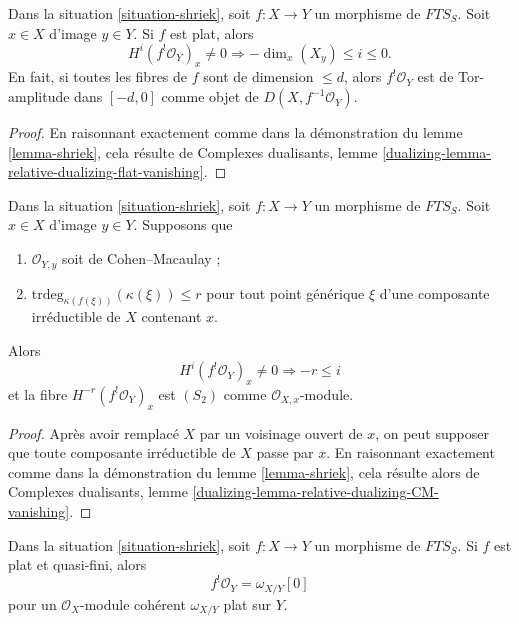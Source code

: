 \begin{lemma}
\label{lemma-flat-shriek}
Dans la situation \ref{situation-shriek}, soit $f : X \to Y$ un morphisme de $\textit{FTS}_S$. Soit $x \in X$ d'image $y \in Y$. Si $f$ est plat, alors
$$
H^i(f^!\mathcal{O}_Y)_x \not = 0
\Rightarrow - \dim_x(X_y) \leq i \leq 0.
$$
En fait, si toutes les fibres de $f$ sont de dimension $\leq d$, alors $f^!\mathcal{O}_Y$ est de Tor-amplitude dans $[-d, 0]$ comme objet de $D(X, f^{-1}\mathcal{O}_Y)$.
\end{lemma}

\begin{proof}
En raisonnant exactement comme dans la démonstration du lemme \ref{lemma-shriek}, cela résulte de Complexes dualisants, lemme \ref{dualizing-lemma-relative-dualizing-flat-vanishing}.
\end{proof}

\begin{lemma}
\label{lemma-shriek-over-CM}
Dans la situation \ref{situation-shriek}, soit $f : X \to Y$ un morphisme de $\textit{FTS}_S$. Soit $x \in X$ d'image $y \in Y$. Supposons que
\begin{enumerate}
\item $\mathcal{O}_{Y, y}$ soit de Cohen–Macaulay ;
\item $\text{trdeg}_{\kappa(f(\xi))}(\kappa(\xi)) \leq r$ pour tout point générique $\xi$ d'une composante irréductible de $X$ contenant $x$.
\end{enumerate}
Alors
$$
H^i(f^!\mathcal{O}_Y)_x \not = 0
\Rightarrow - r \leq i
$$
et la fibre $H^{-r}(f^!\mathcal{O}_Y)_x$ est $(S_2)$ comme $\mathcal{O}_{X, x}$-module.
\end{lemma}

\begin{proof}
Après avoir remplacé $X$ par un voisinage ouvert de $x$, on peut supposer que toute composante irréductible de $X$ passe par $x$. En raisonnant exactement comme dans la démonstration du lemme \ref{lemma-shriek}, cela résulte alors de Complexes dualisants, lemme \ref{dualizing-lemma-relative-dualizing-CM-vanishing}.
\end{proof}

\begin{lemma}
\label{lemma-flat-quasi-finite-shriek}
Dans la situation \ref{situation-shriek}, soit $f : X \to Y$ un morphisme de $\textit{FTS}_S$. Si $f$ est plat et quasi-fini, alors
$$
f^!\mathcal{O}_Y = \omega_{X/Y}[0]
$$
pour un $\mathcal{O}_X$-module cohérent $\omega_{X/Y}$ plat sur $Y$.
\end{lemma}

